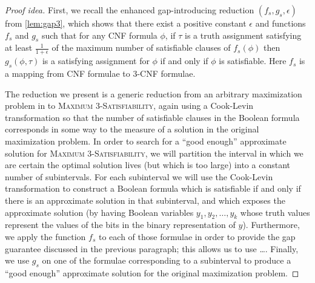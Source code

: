 \documentclass[]{article}
\newenvironment{proofidea}{\begin{proof}[Proof idea]}{\end{proof}}
\begin{document}
\begin{proofidea}
  First, we recall the enhanced gap-introducing reduction $(f_s, g_s, \epsilon)$ from \autoref{lem:gap3}, which shows that there exist a positive constant $\epsilon$ and functions $f_s$ and $g_s$ such that for any CNF formula $\phi$, if $\tau$ is a truth assignment satisfying at least $\frac{1}{1 + \epsilon}$ of the maximum number of satisfiable clauses of $f_s(\phi)$ then $g_s(\phi, \tau)$ is a satisfying assignment for $\phi$ if and only if $\phi$ is satisfiable.
  Here $f_s$ is a mapping from CNF formulae to 3-CNF formulae.

  The reduction we present is a generic reduction from an arbitrary maximization problem in \APX{} to \textsc{Maximum 3-Satisfiability}, again using a Cook-Levin transformation so that the number of satisfiable clauses in the Boolean formula corresponds in some way to the measure of a solution in the original maximization problem.
  In order to search for a ``good enough'' approximate solution for \textsc{Maximum 3-Satisfiability}, we will partition the interval in which we are certain the optimal solution lives (but which is too large) into a constant number of subintervals.
  For each subinterval we will use the Cook-Levin transformation to construct a Boolean formula which is satisfiable if and only if there is an approximate solution in that subinterval, and which exposes the approximate solution (by having Boolean variables $y_1, y_2, \dotsc, y_k$ whose truth values represent the values of the bits in the binary representation of $y$).
  Furthermore, we apply the function $f_s$ to each of those formulae in order to provide the gap guarantee discussed in the previous paragraph; this allows us to use \ldots.
  Finally, we use $g_s$ on one of the formulae corresponding to a subinterval to produce a ``good enough'' approximate solution for the original maximization problem.
\end{proofidea}
\end{document}

